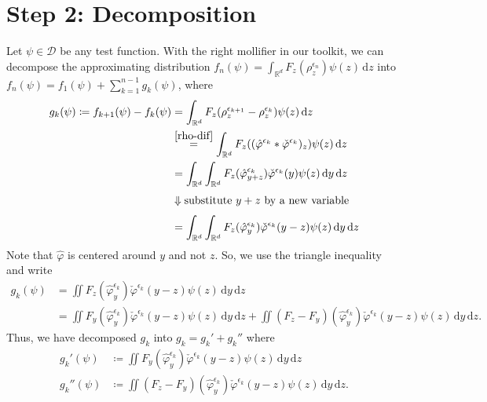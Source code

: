 \section{Step 2: Decomposition}\label{step2:decomposition}

Let \(\psi \in \mathcal{D}\) be any test function. With the right mollifier in our toolkit, we can decompose the approximating distribution \(f_n(\psi) = \int_{\mathbb{R}^d} F_z(\rho_z^{\epsilon_n}) \psi(z)\, \mathrm{d}z\) into \(f_n(\psi) = f_1(\psi) + \sum^{n-1}_{k=1} g_k(\psi)\), where
\begin{align*}
    g_k(\psi) \coloneqq f_{k+1}(\psi) - f_k(\psi) 
    &= \int_{\mathbb{R}^d} F_z(\rho_z^{\epsilon_{k+1}} - \rho_z^{\epsilon_k}) \psi(z)\, \mathrm{d}z \\
    &\overset{\eqref{rho-dif}}{=} \int_{\mathbb{R}^d} F_z((\hat \varphi^{\epsilon_k} * \check \varphi^{\epsilon_k} )_z) \psi(z)\, \mathrm{d}z \\
    &= \int_{\mathbb{R}^d} \int_{\mathbb{R}^{d}} F_z(\hat{\varphi}^{\epsilon_k}_{y+z}) \check \varphi^
    {\epsilon_k}(y) \psi(z) \, \mathrm{d}y \, \mathrm{d}z \\
    \\[-1.2em]
    &\Downarrow \text{substitute \(y+z\) by a new variable} \\
    \\[-1.2em]
    &= \int_{\mathbb{R}^d} \int_{\mathbb{R}^{d}} F_z(\hat{\varphi}^{\epsilon_k}_{y}) \check \varphi^{\epsilon_k}(y-z) \psi(z) \, \mathrm{d}y \, \mathrm{d}z
\end{align*}
Note that \( \hat \varphi \) is centered around \( y \) and not \( z \). So, we use the triangle inequality and write 
\begin{align*}
    g_k(\psi) &= \iint F_z(\hat{\varphi}^{\epsilon_k}_{y}) \check \varphi^{\epsilon_k}(y-z) \psi(z) \, \mathrm{d}y \, \mathrm{d}z \\
    &=  \iint F_y(\hat{\varphi}^{\epsilon_k}_{y}) \check \varphi^{\epsilon_k}(y-z) \psi(z) \, \mathrm{d}y \, \mathrm{d}z +  \iint (F_z - F_y)(\hat{\varphi}^{\epsilon_k}_{y}) \check \varphi^{\epsilon_k}(y-z) \psi(z) \, \mathrm{d}y \, \mathrm{d}z.
\end{align*}
Thus, we have decomposed \(g_k\) into \(g_k = g_k' + g_k''\) where 
\begin{align*}
    g_k'(\psi) &\coloneqq \iint F_y(\hat{\varphi}^{\epsilon_k}_{y}) \check \varphi^{\epsilon_k}(y-z) \psi(z) \, \mathrm{d}y \, \mathrm{d}z \\
    g_k''(\psi) & \coloneqq \iint (F_z - F_y)(\hat{\varphi}^{\epsilon_k}_{y}) \check \varphi^{\epsilon_k}(y-z) \psi(z) \, \mathrm{d}y \, \mathrm{d}z.
\end{align*}
